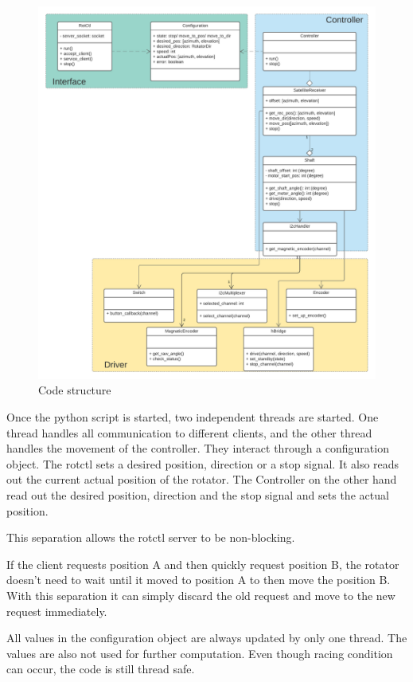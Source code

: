\begin{figure}[H]
	\centering
	\includegraphics[scale=0.5]{../art/SatelliteReceiver.pdf}
	\caption{Code structure}
	\label{Code_structure}
\end{figure}

Once the python script is started, two independent threads are started. One thread handles all communication to different clients, and the other thread handles the movement of the controller. They interact through a configuration object. The rotctl sets a desired position, direction or a stop signal. It also reads out the current actual position of the rotator. The Controller on the other hand read out the desired position, direction and the stop signal and sets the actual position.

This separation allows the rotctl server to be non-blocking.

If the client requests position A and then quickly request position B, the rotator doesn't need to wait until it moved to position A to then move the position B. With this separation it can simply discard the old request and move to the new request immediately.

All values in the configuration object are always updated by only one thread. The values are also not used for further computation. Even though racing condition can occur, the code is still thread safe.

